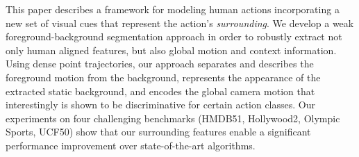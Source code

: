 This paper describes a framework for modeling human actions incorporating a new set of visual cues that represent the action's \emph{surrounding}. We develop a weak foreground-background segmentation approach in order to robustly extract not only human aligned features, but also global motion and context information. Using dense point trajectories, our approach separates and describes the foreground motion from the background, represents the appearance of the extracted static background, and encodes the global camera motion that interestingly is shown to be discriminative for certain action classes. Our experiments on four challenging benchmarks (HMDB51, Hollywood2, Olympic Sports, UCF50) show that our surrounding features enable a significant performance improvement over state-of-the-art algorithms. 